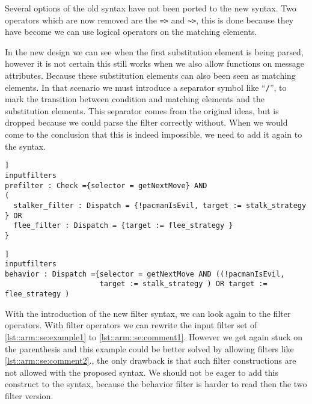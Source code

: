 Several options of the old syntax have not been ported to the new syntax. Two operators which are now
removed are the \lstinline|=>| and \lstinline[language=ebnf]|~>|, this is done because they have become
we can use logical operators on the matching elements.

In the new design we can see when the first substitution element is being parsed, however it is not certain
this still works when we also allow functions on message attributes. Because these substitution elements can also been seen as
matching elements. In that scenario we must introduce a separator symbol like ``\lstinline|/|'', to mark the
transition between condition and matching elements and the substitution elements. This separator comes
from the original ideas, but is dropped because we could parse the filter correctly without. When we would
come to the conclusion that this is indeed impossible, we need to add it again to the syntax.

\begin{lstlisting}[caption = {Dynamic strategy filter module in Pacman, with filter operators}, label=lst::arm::se:comment1,style = listing, language = ComposeStar,float=[tpb]]
inputfilters
prefilter : Check ={selector = getNextMove} AND
(
  stalker_filter : Dispatch = {!pacmanIsEvil, target := stalk_strategy } OR
  flee_filter : Dispatch = {target := flee_strategy }
}
\end{lstlisting}
\begin{lstlisting}[caption = {Dynamic strategy filter module in Pacman, done in one filter}, label=lst::arm::se:comment2,style = listing, language = ComposeStar,float=[tpb]]
inputfilters
behavior : Dispatch ={selector = getNextMove AND ((!pacmanIsEvil, 
                      target := stalk_strategy ) OR target := flee_strategy )
\end{lstlisting}
With the introduction of the new filter syntax, we can look again to the filter operators. With filter operators we can rewrite the input filter set of \autoref{lst::arm::se:example1} to \autoref{lst::arm::se:comment1}. However we get again stuck on the parenthesis and this example could be better
solved by allowing filters like \autoref{lst::arm::se:comment2}., the only drawback is that such filter
constructions are not allowed with the proposed syntax. We should not be eager to add this construct to
the syntax, because the behavior filter is harder to read then the two filter version.